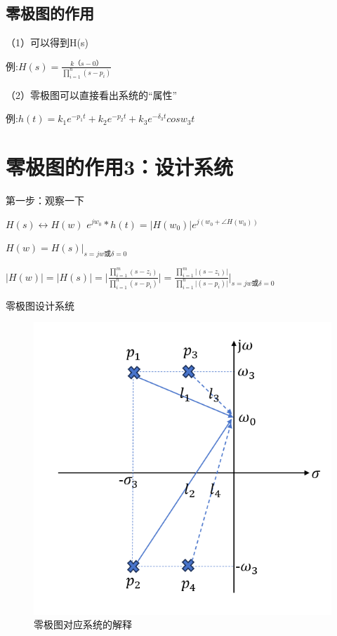 \documentclass[UTF8]{ctexart}
\begin{document}
\subsection{零极图的作用}
（1）可以得到H(s)\par
例:$H(s)=\frac{k（s-0）}{\prod _{i=1}^n(s-p_i)} $ \par
（2）零极图可以直接看出系统的“属性”\par
例:$h(t)=k_1e^{-p_1t}+ k_2e^{-p_2t}+k_3e^{-\delta_3t}cosw_3t$ \par

\section{零极图的作用3：设计系统}
第一步：观察一下\par
$H(s)\longleftrightarrow H(w)$ \qquad $e^{jw_0}\ast h(t)=|H(w_0) \vert e^{j(w_0+\angle H(w_0))} $\par
$H(w)=H(s)\vert _{s=jw\text{或}\delta=0}$\par
$| H(w)\vert =| H(s)\vert =|\frac{\prod _{i=1}^m(s-z_i)}{\prod _{i=1}^n(s-p_i)}  \vert =\frac{\prod _{i=1}^m| (s-z_i)\vert}{\prod _{i=1}^n| (s-p_i)\vert }\vert _{s=jw\text{或}\delta=0}$\par
零极图设计系统\par
\begin{figure}[h]
    \centering         %
    \includegraphics[scale=0.45]{2.png}
    \caption{零极图对应系统的解释}
\end{figure}
\end{document}
